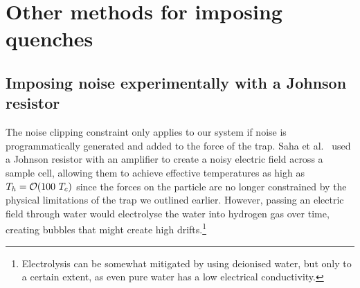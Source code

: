 \documentclass[hyperref={colorlinks=true, urlcolor=blue, citecolor=blue, final, bound}]{sfuthesis}
\begin{document}

\section{Other methods for imposing quenches}
\subsection{Imposing noise experimentally with a Johnson resistor}
The noise clipping constraint only applies to our system if noise is programmatically generated and added to the force of the trap. Saha et al.~\cite{Saha2023} used a Johnson resistor with an amplifier to create a noisy electric field across a sample cell, allowing them to achieve effective temperatures as high as $T_h=\order{100~T_c}$ since the forces on the particle are no longer constrained by the physical limitations of the trap we outlined earlier. However, passing an electric field through water would electrolyse the water into hydrogen gas over time, creating bubbles that might create high drifts.\footnote{Electrolysis can be somewhat mitigated by using deionised water, but only to a certain extent, as even pure water has a low electrical conductivity.}
\end{document}
